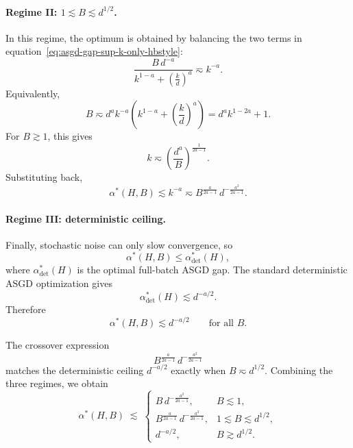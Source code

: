 \documentclass{article}
\def\eqref#1{equation~\ref{#1}}
\begin{document}
\paragraph{Regime II: \(1\lesssim B\lesssim d^{1/2}\).}
In this regime, the optimum is obtained by balancing the two terms in
\eqref{eq:asgd-gap-sup-k-only-hbstyle}:
\[
\frac{B\,d^{-a}}{k^{1-a}+\left(\frac{k}{d}\right)^a}
\eqsim
k^{-a}.
\]
Equivalently,
\[
B
\eqsim
d^a k^{-a}\left(k^{1-a}+\left(\frac{k}{d}\right)^a\right)
=
d^a k^{1-2a}+1.
\]
For \(B\gtrsim 1\), this gives
\[
k\eqsim \left(\frac{d^a}{B}\right)^{\frac1{2a-1}}.
\]
Substituting back,
\[
\alpha^*(H,B)
\lesssim
k^{-a}
\eqsim
B^{\frac{a}{2a-1}}\,d^{-\frac{a^2}{2a-1}}.
\]

\paragraph{Regime III: deterministic ceiling.}
Finally, stochastic noise can only slow convergence, so
\[
\alpha^*(H,B)\le \alpha^*_{\det}(H),
\]
where \(\alpha^*_{\det}(H)\) is the optimal full-batch ASGD gap. The standard
deterministic ASGD optimization gives
\[
\alpha^*_{\det}(H)\lesssim d^{-a/2}.
\]
Therefore
\[
\alpha^*(H,B)\lesssim d^{-a/2}
\qquad\text{for all }B.
\]

The crossover expression
\[
B^{\frac{a}{2a-1}}\,d^{-\frac{a^2}{2a-1}}
\]
matches the deterministic ceiling \(d^{-a/2}\) exactly when \(B\eqsim d^{1/2}\).
Combining the three regimes, we obtain
\begin{equation}
\label{eq:asgd-final-rate-hbstyle}
\alpha^*(H,B)
\;\lesssim\;
\begin{cases}
B\, d^{-\frac{a^2}{2a-1}}, & B \lesssim 1,\\[6pt]
B^{\frac{a}{2a-1}}\, d^{-\frac{a^2}{2a-1}}, & 1 \lesssim B \lesssim d^{1/2},\\[6pt]
d^{-a/2}, & B \gtrsim d^{1/2}.
\end{cases}
\end{equation}

\newpage
\end{document}
